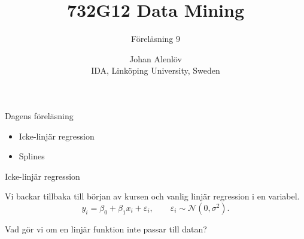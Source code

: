 \documentclass[10pt,english]{beamer}
\title{732G12 Data Mining}
\subtitle{Föreläsning 9}
\date{}
\author{Johan Alenlöv \\ IDA, Linköping University, Sweden}
\begin{document}
\maketitle

\begin{frame}{Dagens föreläsning}

    \begin{itemize}
        \item Icke-linjär regression
        \item Splines
    \end{itemize}
    
\end{frame}

\begin{frame}{Icke-linjär regression}

    Vi backar tillbaka till början av kursen och vanlig linjär regression i en variabel.
    \begin{equation*}
        y_i = \beta_0 + \beta_1 x_i + \varepsilon_i, \qquad \varepsilon_i \sim \mathcal{N}(0, \sigma^2).
    \end{equation*}

    Vad gör vi om en linjär funktion inte passar till datan?

    
\end{frame}
\end{document}
